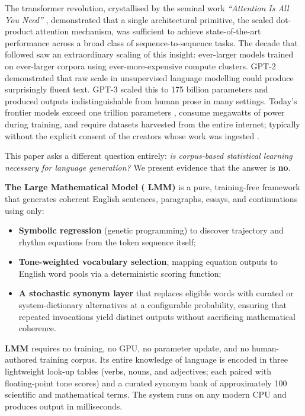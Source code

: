 \documentclass[11pt,a4paper]{article}
\newcommand{\lmm}{\texorpdfstring{%
  \textbf{\color{lmmAccent}LMM}}{LMM}}
\begin{document}
The transformer revolution, crystallised by the seminal work \textit{``Attention Is All You Need''} \citep{vaswani2017attention}, demonstrated that a single architectural primitive, the scaled dot-product attention mechanism, was sufficient to achieve state-of-the-art performance across a broad class of sequence-to-sequence tasks. The decade that followed saw an extraordinary scaling of this insight: ever-larger models trained on ever-larger corpora using ever-more-expensive compute clusters. GPT-2 \citep{radford2019language} demonstrated that raw scale in unsupervised language modelling could produce surprisingly fluent text. GPT-3 \citep{brown2020language} scaled this to 175 billion parameters and produced outputs indistinguishable from human prose in many settings. Today's frontier models exceed one trillion parameters \citep{fedus2022switch}, consume megawatts of power during training, and require datasets harvested from the entire internet; typically without the explicit consent of the creators whose work was ingested \citep{strubell2019energy,grynbaum2023nyt}.

This paper asks a different question entirely: \emph{is corpus-based statistical learning necessary for language generation?} We present evidence that the answer is \textbf{no}.

\textbf{The Large Mathematical Model (\lmm{})} is a pure, training-free framework that generates coherent English sentences, paragraphs, essays, and continuations using only:

\begin{itemize}[noitemsep,topsep=4pt]
  \item \textbf{Symbolic regression} (genetic programming) to discover trajectory and rhythm equations from the token sequence itself;
  \item \textbf{Tone-weighted vocabulary selection}, mapping equation outputs to English word pools via a deterministic scoring function;
  \item \textbf{A stochastic synonym layer} that replaces eligible words with curated or system-dictionary alternatives at a configurable probability, ensuring that repeated invocations yield distinct outputs without sacrificing mathematical coherence.
\end{itemize}

\lmm{} requires no training, no GPU, no parameter update, and no human-authored training corpus. Its entire knowledge of language is encoded in three lightweight look-up tables (verbs, nouns, and adjectives; each paired with floating-point tone scores) and a curated synonym bank of approximately 100 scientific and mathematical terms. The system runs on any modern CPU and produces output in milliseconds.
\end{document}
